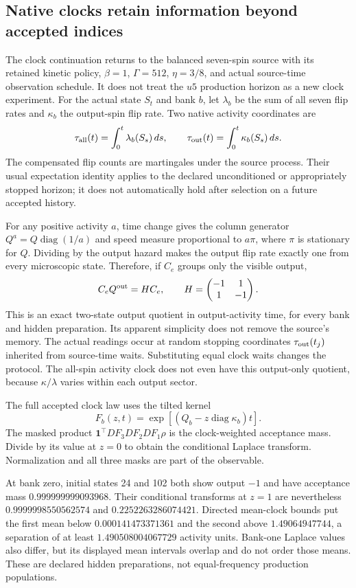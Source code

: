 \subsection{Native clocks retain information beyond accepted indices}

The clock continuation returns to the balanced seven-spin source with its retained kinetic policy, $\beta=1$, $\Gamma=512$, $\eta=3/8$, and actual source-time observation schedule. It does not treat the $u5$ production horizon as a new clock experiment. For the actual state $S_t$ and bank $b$, let $\lambda_b$ be the sum of all seven flip rates and $\kappa_b$ the output-spin flip rate. Two native activity coordinates are
\[
 \tau_{\rm all}(t)=\int_0^t\lambda_b(S_s)\,ds,
 \qquad
 \tau_{\rm out}(t)=\int_0^t\kappa_b(S_s)\,ds.
\]
The compensated flip counts are martingales under the source process. Their usual expectation identity applies to the declared unconditioned or appropriately stopped horizon; it does not automatically hold after selection on a future accepted history.

For any positive activity $a$, time change gives the column generator $Q^a=Q\operatorname{diag}(1/a)$ and speed measure proportional to $a\pi$, where $\pi$ is stationary for $Q$. Dividing by the output hazard makes the output flip rate exactly one from every microscopic state. Therefore, if $C_e$ groups only the visible output,
\[
 C_eQ^{\rm out}=H C_e,
 \qquad
 H=\begin{pmatrix}-1&1\\1&-1\end{pmatrix}.
\]
This is an exact two-state output quotient in output-activity time, for every bank and hidden preparation. Its apparent simplicity does not remove the source's memory. The actual readings occur at random stopping coordinates $\tau_{\rm out}(t_j)$ inherited from source-time waits. Substituting equal clock waits changes the protocol. The all-spin activity clock does not even have this output-only quotient, because $\kappa/\lambda$ varies within each output sector.

The full accepted clock law uses the tilted kernel
\[
 F_b(z,t)=\exp[(Q_b-z\operatorname{diag}\kappa_b)t].
\]
The masked product $\mathbf1^\top D F_3 D F_2 D F_1\rho$ is the clock-weighted acceptance mass. Divide by its value at $z=0$ to obtain the conditional Laplace transform. Normalization and all three masks are part of the observable.

At bank zero, initial states 24 and 102 both show output $-1$ and have acceptance mass $0.999999999093968$. Their conditional transforms at $z=1$ are nevertheless $0.9999998550562574$ and $0.2252263286074421$. Directed mean-clock bounds put the first mean below $0.000141473371361$ and the second above $1.49064947744$, a separation of at least $1.490508004067729$ activity units. Bank-one Laplace values also differ, but its displayed mean intervals overlap and do not order those means. These are declared hidden preparations, not equal-frequency production populations.

